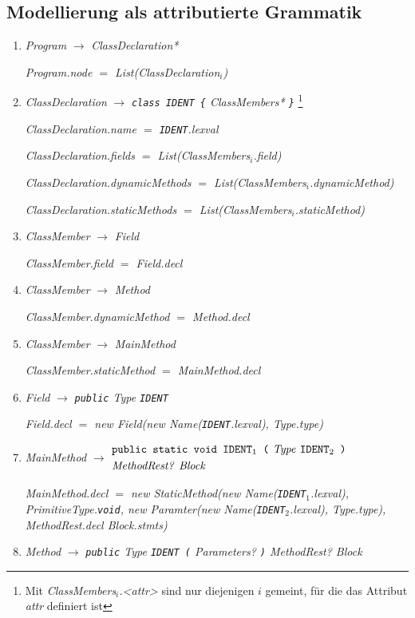 \documentclass[12pt,a4paper]{scrartcl}
\renewcommand{\prod}[2]{\textit{#1} $\rightarrow$ \textit{#2}}
\newcommand{\tok}[1]{\textnormal{\texttt{#1}}}
\newcommand{\assign}[2]{\textit{#1} $=$ #2}
\newcommand{\List}[1]{\textnormal{List(\textit{#1})}}
\newcommand{\new}[2]{\textnormal{new #1(\textit{#2})}}
\newcommand{\attr}[1]{\parbox{\linewidth}{\raggedleft \textit{#1}}}
\begin{document}
\newpage
\subsection{Modellierung als attributierte Grammatik}

\begin{enumerate}
    \item \prod{Program}{ClassDeclaration*}\\
        \attr{\assign{Program.node}{\List{ClassDeclaration$_i$}}}
    \item \prod{ClassDeclaration}{\tok{class IDENT \{} ClassMembers* \tok{\}}}
        \footnote{Mit \textit{ClassMembers$_i$.<attr>} sind nur diejenigen $i$ gemeint, für die das Attribut \textit{attr} definiert ist}\\
        \attr{\assign{ClassDeclaration.name}{\tok{IDENT}.lexval}}
        \attr{\assign{ClassDeclaration.fields}{\List{ClassMembers$_i$.field}}}
        \attr{\assign{ClassDeclaration.dynamicMethods}{\List{ClassMembers$_i$.dynamicMethod}}}
        \attr{\assign{ClassDeclaration.staticMethods}{\List{ClassMembers$_i$.staticMethod}}}
    \item \prod{ClassMember}{Field}\\
        \attr{\assign{ClassMember.field}{Field.decl}}
    \item \prod{ClassMember}{Method}\\
        \attr{\assign{ClassMember.dynamicMethod}{Method.decl}}
    \item \prod{ClassMember}{MainMethod}\\
        \attr{\assign{ClassMember.staticMethod}{MainMethod.decl}}
    \item \prod{Field}{\tok{public} Type \tok{IDENT}}\\
        \attr{\assign{Field.decl}{\new{Field}{\new{Name}{\tok{IDENT}.lexval}, Type.type}}}
    \item \textit{MainMethod} $\rightarrow$
        $\begin{aligned} &\textit{\tok{public static void IDENT$_1$ (} Type \tok{IDENT$_2$ )}} \\
                         &\textit{MethodRest? Block} \end{aligned}$\\
        \attr{\assign{MainMethod.decl}{\new{StaticMethod}{\new{Name}{\tok{IDENT$_1$}.lexval}, PrimitiveType.\tok{void}, \new{Paramter}{\new{Name}{\tok{IDENT}$_2$.lexval}, Type.type}, MethodRest.decl Block.stmts}}}
    \item \prod{Method}{\tok{public} Type \tok{IDENT (} Parameters? \tok{)} MethodRest? Block}

\end{enumerate}
\end{document}
